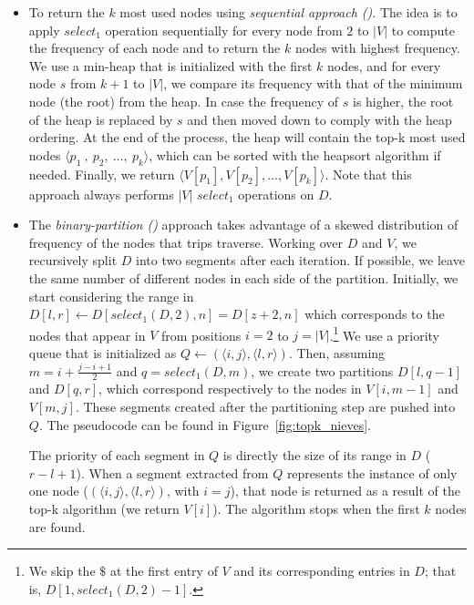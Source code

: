 \begin{itemize}[leftmargin=3mm]
\begin{itemize}
\item To return the $k$ most used nodes using {\em sequential approach (\Stkseq)}. The idea is
to apply  $select_1$ operation sequentially for every node from $2$ to $|V|$ to compute the 
frequency of each node and to return the $k$ nodes with highest frequency.
We use a min-heap that is initialized with
the first $k$ nodes, and for every node $s$ from $k+1$ to $|V|$, 
we compare its frequency with that of the minimum node (the root) from
the heap. In case the frequency of $s$ is higher, the root of the heap is replaced by $s$ and
then moved down to comply with the heap ordering. At the end of the process, the heap
will contain the top-k most used nodes $\langle p_1\:,\:p_2,\:\dots,\:p_k \rangle$, which can be 
sorted with the heapsort algorithm if needed. Finally, we return $\langle V[p_1],V[p_2],\dots,V[p_k]\rangle$.
Note that this  approach always performs $|V|$ $select_1$ operations on $D$.

\item The {\em binary-partition (\Stkbin)} approach takes advantage of a skewed 
distribution of frequency of the nodes that trips traverse.  Working over $D$ and $V$, we 
recursively split $D$  into two segments after each iteration. 
If possible, we leave the same number of different nodes in each side of the partition. 
Initially, we start considering the range in $D[l,r] \leftarrow D[select_1(D,2),n]=D[z+2,n]$ 
which corresponds to the nodes that appear in 
$V$ from positions $i=2$ to $j=|V|$.\footnote{We skip the $\$$ at the first entry of $V$ and its corresponding 
entries in $D$; that is, $D[1,select_1(D,2)-1]$.}
We use a priority queue that is initialized as $Q \leftarrow (\langle i,j\rangle, \langle l,r\rangle)$.
Then, assuming $m=i + \frac{j-i+1}{2}$ and $q=select_1(D,m)$, we create two partitions 
$D[l, q-1]$ and  $D[q, r]$, which correspond respectively to the nodes in $V[i,m-1]$ and $V[m, j]$.
These  segments created after the partitioning step are
pushed into  $Q$. %
The pseudocode can be found in  Figure~\ref{fig:topk_nieves}.

The priority of each segment in $Q$ is
directly the size of its range in $D$ ($r-l+1$). 
When a segment extracted from $Q$ represents the instance of only one node ($(\langle i,j\rangle, \langle l,r\rangle)$, with $i=j$),
that node is returned as a result of the top-k algorithm (we return $V[i]$). The algorithm stops when the first $k$
nodes are found.


\end{itemize}
\end{itemize}
